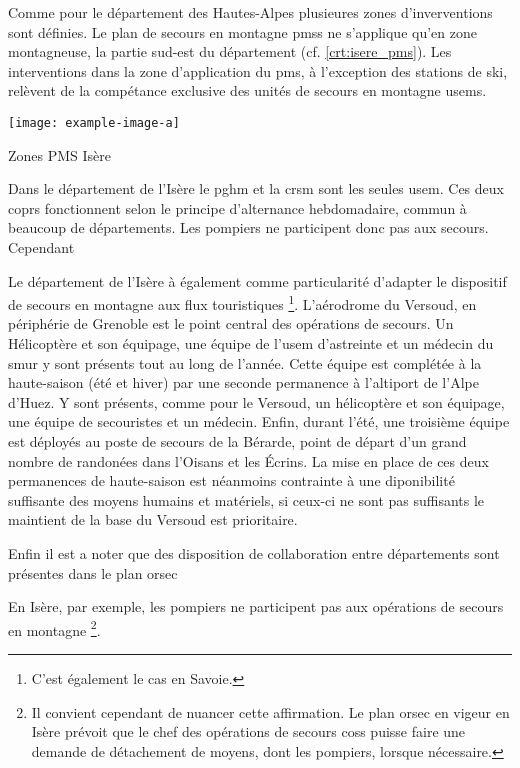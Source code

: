 Comme pour le département des Hautes-Alpes plusieures zones
d'inverventions sont définies. Le plan de secours en montagne
\acp{pms} ne s'applique qu'en zone montagneuse, \ie la partie sud-est
du département (cf. \autoref{crt:isere_pms}). Les interventions dans
la zone d'application du \ac{pms}, à l'exception des stations de ski,
relèvent de la compétance exclusive des unités de secours en montagne
\acp{usem}.

\begin{carte}
  \centering
  \texttt{[image: example-image-a]}
  \caption{Zones PMS Isère}
  \label{crt:isere_pms}
\end{carte}

Dans le département de l'Isère le \ac{pghm} et la \ac{crsm} sont les
seules \ac{usem}. Ces deux coprs fonctionnent selon le principe
d'alternance hebdomadaire, commun à beaucoup de départements. Les
pompiers ne participent donc pas aux secours. Cependant 

Le département de l'Isère à également comme particularité d'adapter le
dispositif de secours en montagne aux flux touristiques
\footnote{C'est également le cas en Savoie.}. L'aérodrome du Versoud,
en périphérie de Grenoble est le point central des opérations de
secours. Un Hélicoptère et son équipage, une équipe de l'\ac{usem}
d'astreinte et un médecin du \ac{smur} y sont présents tout au long de
l'année. Cette équipe est complétée à la haute-saison (été et hiver)
par une seconde permanence à l'altiport de l'Alpe d'Huez. Y sont
présents, comme pour le Versoud, un hélicoptère et son équipage, une
équipe de secouristes et un médecin. Enfin, durant l'été, une
troisième équipe est déployés au poste de secours de la Bérarde, point
de départ d'un grand nombre de randonées dans l'Oisans et les
Écrins. La mise en place de ces deux permanences de haute-saison est
néanmoins contrainte à une diponibilité suffisante des moyens humains
et matériels, si ceux-ci ne sont pas suffisants le maintient de la
base du Versoud est prioritaire.

Enfin il est a noter que des disposition de collaboration entre
départements sont présentes dans le plan \ac{orsec}

En
Isère, par exemple, les pompiers ne participent pas aux opérations de
secours en montagne \footnote{Il convient cependant de nuancer cette
  affirmation. Le plan \ac{orsec} en vigeur en Isère prévoit que le
  chef des opérations de secours \acp{cos} puisse faire une demande de
  détachement de moyens, dont les pompiers, lorsque nécessaire.}.

